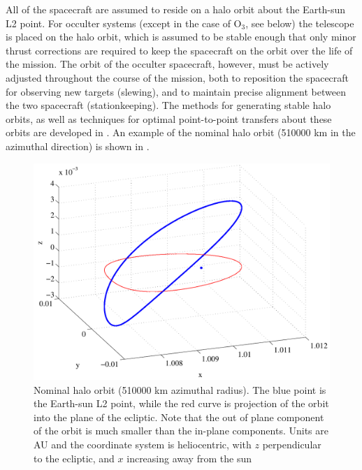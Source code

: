 All of the spacecraft are assumed to reside on a halo orbit about the Earth-sun L2 point.  For occulter systems (except in the case of O$_3$, see below) the telescope is placed on the halo orbit, which is assumed to be stable enough that only minor thrust corrections are required to keep the spacecraft on the orbit over the life of the mission.  The orbit of the occulter spacecraft, however, must be actively adjusted throughout the course of the mission, both to reposition the spacecraft for observing new targets (slewing), and to maintain precise alignment between the two spacecraft (stationkeeping).  The methods for generating stable halo orbits, as well as techniques for optimal point-to-point transfers about these orbits are developed in \citet{kolemen2008thesis}.  An example of the nominal halo orbit (510000 km in the azimuthal direction) is shown in .
\begin{figure}[ht]
\centering
   \includegraphics[width = 5.5in]{./figures/halo_orbit}
 \caption[Halo orbit]{ \label{fig:halo_orbit} Nominal halo orbit (510000 km azimuthal radius).  The blue point is the Earth-sun L2 point, while the red curve is projection of the orbit into the plane of the ecliptic.  Note that the out of plane component of the orbit is much smaller than the in-plane components.  Units are AU and the coordinate system is heliocentric, with $z$ perpendicular to the ecliptic, and $x$ increasing away from the sun}
 \end{figure}

